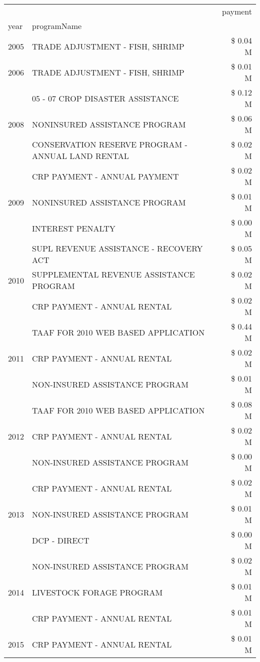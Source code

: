 \begin{tabular}{llr}
\toprule
 &  & payment \\
year & programName &  \\
\midrule
2005 & TRADE ADJUSTMENT - FISH, SHRIMP & \$ 0.04 M \\
\cline{1-3}
2006 & TRADE ADJUSTMENT - FISH, SHRIMP & \$ 0.01 M \\
\cline{1-3}
\multirow[t]{3}{*}{2008} & 05 - 07 CROP DISASTER ASSISTANCE & \$ 0.12 M \\
 & NONINSURED ASSISTANCE PROGRAM & \$ 0.06 M \\
 & CONSERVATION RESERVE PROGRAM - ANNUAL LAND RENTAL & \$ 0.02 M \\
\cline{1-3}
\multirow[t]{3}{*}{2009} & CRP PAYMENT - ANNUAL PAYMENT & \$ 0.02 M \\
 & NONINSURED ASSISTANCE PROGRAM & \$ 0.01 M \\
 & INTEREST PENALTY & \$ 0.00 M \\
\cline{1-3}
\multirow[t]{3}{*}{2010} & SUPL REVENUE ASSISTANCE - RECOVERY ACT & \$ 0.05 M \\
 & SUPPLEMENTAL REVENUE ASSISTANCE PROGRAM & \$ 0.02 M \\
 & CRP PAYMENT - ANNUAL RENTAL & \$ 0.02 M \\
\cline{1-3}
\multirow[t]{3}{*}{2011} & TAAF FOR 2010 WEB BASED APPLICATION & \$ 0.44 M \\
 & CRP PAYMENT - ANNUAL RENTAL & \$ 0.02 M \\
 & NON-INSURED ASSISTANCE PROGRAM & \$ 0.01 M \\
\cline{1-3}
\multirow[t]{3}{*}{2012} & TAAF FOR 2010 WEB BASED APPLICATION & \$ 0.08 M \\
 & CRP PAYMENT - ANNUAL RENTAL & \$ 0.02 M \\
 & NON-INSURED ASSISTANCE PROGRAM & \$ 0.00 M \\
\cline{1-3}
\multirow[t]{3}{*}{2013} & CRP PAYMENT - ANNUAL RENTAL & \$ 0.02 M \\
 & NON-INSURED ASSISTANCE PROGRAM & \$ 0.01 M \\
 & DCP - DIRECT & \$ 0.00 M \\
\cline{1-3}
\multirow[t]{3}{*}{2014} & NON-INSURED ASSISTANCE PROGRAM & \$ 0.02 M \\
 & LIVESTOCK FORAGE PROGRAM & \$ 0.01 M \\
 & CRP PAYMENT - ANNUAL RENTAL & \$ 0.01 M \\
\cline{1-3}
\multirow[t]{3}{*}{2015} & CRP PAYMENT - ANNUAL RENTAL & \$ 0.01 M \\

\end{tabular}
